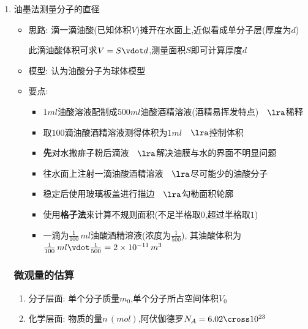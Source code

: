 \documentclass{article}
\begin{document}
\begin{enumerate}
    \item 油墨法测量分子的直径
          \begin{itemize}
              \item 思路: 滴一滴油酸(已知体积$V$)摊开在水面上,近似看成单分子层(厚度为$d$)

                    \hspace{2.7em}此滴油酸体积可求$V = S \vdot d $,测量面积$S$即可计算厚度$d$
              \item 模型: 认为油酸分子为球体模型
              \item 要点:
                    \begin{itemize}
                        \item $1ml$油酸溶液配制成$500ml$油酸酒精溶液(酒精易挥发特点)$\hspace{1em}\lra$稀释
                        \item 取$100$滴油酸酒精溶液测得体积为$1ml$$\hspace{1em}\lra$控制体积
                        \item \textbf{先}对水撒痱子粉后滴液$\hspace{1em}\lra$解决油膜与水的界面不明显问题
                        \item 往水面上注射一滴油酸酒精溶液$\hspace{1em}\lra$尽可能少的油酸分子
                        \item 稳定后使用玻璃板盖进行描边$\hspace{1em}\lra$勾勒面积轮廓
                        \item 使用\textbf{格子法}来计算不规则面积(不足半格取$0$,超过半格取$1$)
                        \item 一滴为$\frac{1}{100} \, ml$油酸酒精溶液(浓度为$\frac{1}{500}$),
                              其油酸体积为$\frac{1}{100} \, ml \vdot \frac{1}{500} = 2 \times 10 ^{-11} \, m^{3}$
                    \end{itemize}
          \end{itemize}

          \vspace{2em}

          \subsubsection{微观量的估算}
          \begin{enumerate}[label = (\arabic*{})]
              \item 分子层面: 单个分子质量$m_{0}$,单个分子所占空间体积$V_{0}$
              \item 化学层面: 物质的量$n \, (mol)$,阿伏伽德罗$N_{A} = 6.02 \cross 10^{23}$


\end{enumerate}
\end{enumerate}
\end{document}
